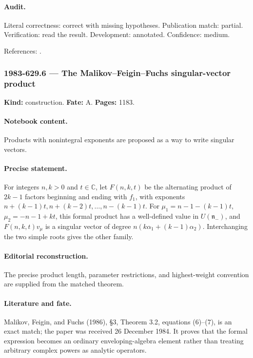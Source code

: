 \paragraph{Audit.} Literal correctness: correct with missing hypotheses. Publication match: partial. Verification: read the result. Development: annotated. Confidence: medium.

\noindent References: \citep{frenkel2007loop}.\par

\subsubsection{1983-629.6 --- The Malikov–Feigin–Fuchs singular-vector product}

\label{item:1983-629.6}

\noindent\textbf{Kind:} construction. \textbf{Fate:} A. \textbf{Pages:} 1183.\par

\paragraph{Notebook content.} Products with nonintegral exponents are proposed as a way to write singular vectors.

\paragraph{Precise statement.} For integers \(n,k>0\) and \(t\in\mathbb C\), let \(F(n,k,t)\) be the alternating product of \(2k-1\) factors beginning and ending with \(f_1\), with exponents \(n+(k-1)t,n+(k-2)t,\ldots,n-(k-1)t\). For \(\mu_1=n-1-(k-1)t\), \(\mu_2=-n-1+kt\), this formal product has a well-defined value in \(U(\mathfrak n_-)\), and \(F(n,k,t)v_\mu\) is a singular vector of degree \(n(k\alpha_1+(k-1)\alpha_2)\). Interchanging the two simple roots gives the other family.

\paragraph{Editorial reconstruction.} The precise product length, parameter restrictions, and highest-weight convention are supplied from the matched theorem.

\paragraph{Literature and fate.} Malikov, Feigin, and Fuchs (1986), \S3, Theorem 3.2, equations (6)–(7), is an exact match; the paper was received 26 December 1984. It proves that the formal expression becomes an ordinary enveloping-algebra element rather than treating arbitrary complex powers as analytic operators.


